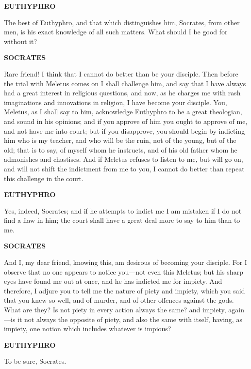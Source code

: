 \documentclass[11pt,letter]{article}
\begin{document}
\par \textbf{EUTHYPHRO}
\par   The best of Euthyphro, and that which distinguishes him, Socrates, from other men, is his exact knowledge of all such matters. What should I be good for without it?

\par \textbf{SOCRATES}
\par   Rare friend! I think that I cannot do better than be your disciple. Then before the trial with Meletus comes on I shall challenge him, and say that I have always had a great interest in religious questions, and now, as he charges me with rash imaginations and innovations in religion, I have become your disciple. You, Meletus, as I shall say to him, acknowledge Euthyphro to be a great theologian, and sound in his opinions; and if you approve of him you ought to approve of me, and not have me into court; but if you disapprove, you should begin by indicting him who is my teacher, and who will be the ruin, not of the young, but of the old; that is to say, of myself whom he instructs, and of his old father whom he admonishes and chastises. And if Meletus refuses to listen to me, but will go on, and will not shift the indictment from me to you, I cannot do better than repeat this challenge in the court.

\par \textbf{EUTHYPHRO}
\par   Yes, indeed, Socrates; and if he attempts to indict me I am mistaken if I do not find a flaw in him; the court shall have a great deal more to say to him than to me.

\par \textbf{SOCRATES}
\par   And I, my dear friend, knowing this, am desirous of becoming your disciple. For I observe that no one appears to notice you—not even this Meletus; but his sharp eyes have found me out at once, and he has indicted me for impiety. And therefore, I adjure you to tell me the nature of piety and impiety, which you said that you knew so well, and of murder, and of other offences against the gods. What are they? Is not piety in every action always the same? and impiety, again—is it not always the opposite of piety, and also the same with itself, having, as impiety, one notion which includes whatever is impious?

\par \textbf{EUTHYPHRO}
\par   To be sure, Socrates.
\end{document}
